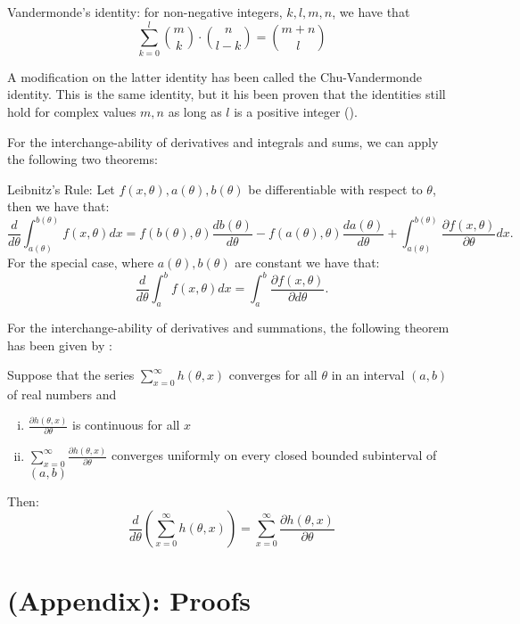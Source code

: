 \begin{definition}
    Vandermonde's identity: for non-negative integers, \(k, l, m, n\), we have that \[\sum_{k = 0}^{l} \binom{m}{k} \cdot \binom{n}{l - k} = \binom{m + n}{l}\]
\end{definition}
A modification on the latter identity has been called the Chu-Vandermonde identity. This is the same identity, but it his been proven that the identities still hold for complex values \(m, n\) as long as \(l\) is a positive integer (\cite{askey75}).

For the interchange-ability of derivatives and integrals and sums, we can apply the following two theorems:

\begin{theorem}
    Leibnitz's Rule:
    Let \(f(x, \theta), a(\theta), b(\theta)\) be differentiable with respect to \(\theta\), then we have that:
    \[ \frac{d}{d\theta} \int_{a(\theta)}^{b(\theta)} f(x, \theta) dx = f(b(\theta), \theta) \frac{d b(\theta)}{d\theta} - f(a(\theta), \theta) \frac{d a(\theta)}{d\theta} + \int_{a(\theta)}^{b(\theta)} \frac{\partial f(x, \theta) }{\partial \theta} dx.\] For the special case, where \(a(\theta), b(\theta)\) are constant we have that: 
    \[\frac{d}{d\theta} \int_{a}^{b} f(x, \theta) dx =  \int_{a}^{b} \frac{ \partial f(x, \theta)}{ \partial d\theta}.\]
\end{theorem}

For the interchange-ability of derivatives and summations, the following theorem has been given by \cite{casella2002}:
\begin{theorem}
    Suppose that the series \(\sum_{x = 0}^{\infty} h(\theta, x)\) converges for all \(\theta\) in an interval \((a, b)\) of real numbers and 
    
    \begin{enumerate}[(i)]
        \item \(\frac{\partial h(\theta, x)}{\partial \theta}\) is continuous for all \(x\)
        \item \(\sum_{x = 0}^{\infty} \frac{\partial h(\theta, x)}{\partial \theta}\) converges uniformly on every closed bounded subinterval of \((a, b)\)
    \end{enumerate}
    Then:
    \[
    \frac{d}{d \theta} \left( \sum_{x = 0}^{\infty} h(\theta, x) \right) = \sum_{x = 0}^{\infty} \frac{\partial h(\theta, x)}{\partial \theta}
    \]
    
   
\end{theorem}


\newpage
\section{(Appendix): Proofs}\label{s:app_B}

